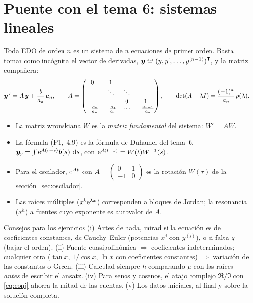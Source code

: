 \documentclass[11pt,twoside]{article}
\newcommand\mat[1]{\begin{pmatrix}#1\end{pmatrix}}
\newcommand\smat[1]{\left(\begin{smallmatrix}#1\end{smallmatrix}\right)}
\newcommand\pI[1]{(P1,~#1)}
\begin{document}
\section{Puente con el tema 6: sistemas lineales}\label{sec:puente}

Toda EDO de orden $n$ es un sistema de $n$ ecuaciones de primer orden. Basta tomar como incógnita el vector de
derivadas, $\bm y\defeq(y,y',\dots,y^{(n-1)})\T$, y la matriz compañera:
\begin{equation}\label{eq:companera}
\bm y\,'=A\,\bm y+\frac{b}{a_n}\,\bm e_n,\qquad
A=\mat{0&1&&\\&\ddots&\ddots&\\&&0&1\\-\tfrac{a_0}{a_n}&-\tfrac{a_1}{a_n}&\cdots&-\tfrac{a_{n-1}}{a_n}},\qquad
\det(A-\lambda\Id)=\frac{(-1)^n}{a_n}\,p(\lambda).
\end{equation}

\begin{itemize}
\item La matriz wronskiana $W$ es la \emph{matriz fundamental} del sistema: $W'=AW$.
\item La fórmula \pI{4.9} es la fórmula de Duhamel del tema~6, $\bm y_p=\int\mathrm{e}^{A(t-s)}\bm b(s)\,\mathop{}\!\mathrm{d} s$, con
$\mathrm{e}^{A(t-s)}=W(t)W^{-1}(s)$.
\item Para el oscilador, $\mathrm{e}^{At}$ con $A=\smat{0&1\\-1&0}$ es la rotación $W(\tau)$ de la sección~\ref{sec:oscilador}.
\item Las raíces múltiples ($x^k\mathrm{e}^{\lambda x}$) corresponden a bloques de Jordan; la resonancia ($x^h$) a fuentes cuyo
exponente es autovalor de $A$.
\end{itemize}

\begin{consejo}{Consejos para los ejercicios}
(i) Antes de nada, mirad si la ecuación es de coeficientes constantes, de Cauchy--Euler (potencias $x^j$ con $y^{(j)}$),
o si falta $y$ (bajar el orden). (ii) Fuente cuasipolinómica $\Rightarrow$ coeficientes indeterminados; cualquier otra
($\tan x$, $1/\cos x$, $\ln x$ con coeficientes constantes) $\Rightarrow$ variación de las constantes o Green.
(iii) Calculad siempre $h$ comparando $\mu$ con las raíces \emph{antes} de escribir el ansatz. (iv) Para senos y cosenos,
el atajo complejo $\Re/\Im$ con \eqref{eq:conj} ahorra la mitad de las cuentas. (v) Los datos iniciales, al final y sobre
la solución completa.
\end{consejo}
\end{document}
